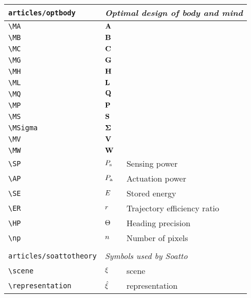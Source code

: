\begin{longtable}{lll}
 {\color[rgb]{0.5,0.5,0.5}\texttt{articles/optbody}} & \multicolumn{2}{l}{\emph{Optimal design of body and mind}}\\ 
 \hline
{\color[rgb]{0.5,0.5,0.5}\texttt{\textbackslash MA}} & $\mathbf{A}$ & \\ 
 {\color[rgb]{0.5,0.5,0.5}\texttt{\textbackslash MB}} & $\mathbf{B}$ & \\ 
 {\color[rgb]{0.5,0.5,0.5}\texttt{\textbackslash MC}} & $\mathbf{C}$ & \\ 
 {\color[rgb]{0.5,0.5,0.5}\texttt{\textbackslash MG}} & $\mathbf{G}$ & \\ 
 {\color[rgb]{0.5,0.5,0.5}\texttt{\textbackslash MH}} & $\mathbf{H}$ & \\ 
 {\color[rgb]{0.5,0.5,0.5}\texttt{\textbackslash ML}} & $\mathbf{L}$ & \\ 
 {\color[rgb]{0.5,0.5,0.5}\texttt{\textbackslash MQ}} & $\mathbf{Q}$ & \\ 
 {\color[rgb]{0.5,0.5,0.5}\texttt{\textbackslash MP}} & $\mathbf{P}$ & \\ 
 {\color[rgb]{0.5,0.5,0.5}\texttt{\textbackslash MS}} & $\mathbf{S}$ & \\ 
 {\color[rgb]{0.5,0.5,0.5}\texttt{\textbackslash MSigma}} & $\mathbf{\Sigma}$ & \\ 
 {\color[rgb]{0.5,0.5,0.5}\texttt{\textbackslash MV}} & $\mathbf{V}$ & \\ 
 {\color[rgb]{0.5,0.5,0.5}\texttt{\textbackslash MW}} & $\mathbf{W}$ & \\ 
 {\color[rgb]{0.5,0.5,0.5}\texttt{\textbackslash SP}} & $P_{\text{s}}$ &  Sensing power\\ 
 {\color[rgb]{0.5,0.5,0.5}\texttt{\textbackslash AP}} & $P_{\text{a}}$ &  Actuation power\\ 
 {\color[rgb]{0.5,0.5,0.5}\texttt{\textbackslash SE}} & $E$ &  Stored energy\\ 
 {\color[rgb]{0.5,0.5,0.5}\texttt{\textbackslash ER}} & $r$ &  Trajectory efficiency ratio\\ 
 {\color[rgb]{0.5,0.5,0.5}\texttt{\textbackslash HP}} & $\Theta$ &  Heading precision\\ 
 {\color[rgb]{0.5,0.5,0.5}\texttt{\textbackslash np}} & $n$ &  Number of pixels\\ 
  &  & \\ 
 {\color[rgb]{0.5,0.5,0.5}\texttt{articles/soattotheory}} & \multicolumn{2}{l}{\emph{Symbols used by Soatto}}\\ 
 \hline
{\color[rgb]{0.5,0.5,0.5}\texttt{\textbackslash scene}} & $\xi$ &  scene\\ 
 {\color[rgb]{0.5,0.5,0.5}\texttt{\textbackslash representation}} & $\hat{\xi}$ &  representation\\ 

\end{longtable}
